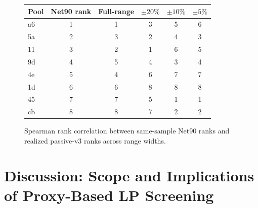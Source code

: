 \documentclass[10pt,conference,compsocconf]{IEEEtran}
\begin{document}
\begin{figure}[t]
\centering
\footnotesize

\begin{minipage}[t]{0.60\textwidth}
\vspace{0pt}
\centering
\begin{tabular}{lccccc}
\toprule
Pool & Net90 rank & Full-range & $\pm20\%$ & $\pm10\%$ & $\pm5\%$ \\
\midrule
a6 & 1 & 1 & 3 & 5 & 6 \\
5a & 2 & 3 & 2 & 4 & 3 \\
11 & 3 & 2 & 1 & 6 & 5 \\
9d & 4 & 5 & 4 & 3 & 4 \\
4e & 5 & 4 & 6 & 7 & 7 \\
1d & 6 & 6 & 8 & 8 & 8 \\
45 & 7 & 7 & 5 & 1 & 1 \\
cb & 8 & 8 & 7 & 2 & 2 \\
\bottomrule
\end{tabular}
\label{tab:proxy_vs_realized_ranks}
\end{minipage}
\hfill
\begin{minipage}[t]{0.36\textwidth}
\vspace{0pt}
\centering
{}
\caption{Spearman rank correlation between same-sample Net90 ranks and
realized passive-v3 ranks across range widths.}
\label{fig:concentration_breakdown}
\end{minipage}

\end{figure}


\section{Discussion: Scope and Implications of Proxy-Based LP Screening}
\label{sec:discussion}
\end{document}
